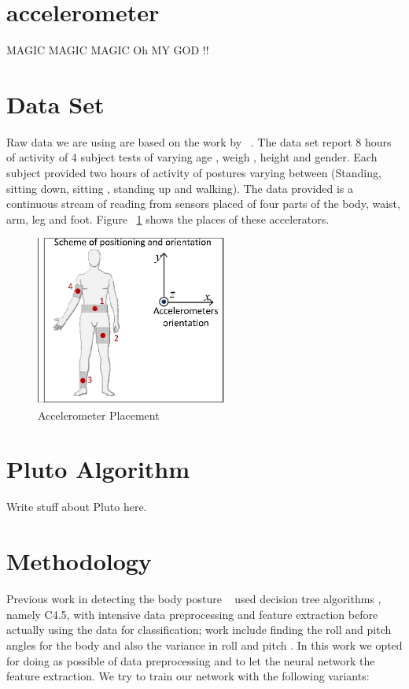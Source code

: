 \documentclass{article}
\begin{document}
\section{accelerometer}
\label{accelerometer} 
MAGIC MAGIC MAGIC Oh MY GOD !!

\section{Data Set}
\label{DataSet}

Raw data we are using are based on the work by ~\cite{ugulino2012wearable}. The data set report 8 hours of activity of 4 subject tests 
of varying age , weigh , height and gender. Each subject provided two hours of activity of postures varying between (Standing,
sitting down, sitting , standing up and walking). The data provided is a continuous stream of reading from sensors placed of four 
parts of the body, waist, arm, leg and foot. Figure ~\ref{acc_placement} shows the places of these accelerators.   


\begin{figure}[h]
\centering
\includegraphics[width=2.5in]{acc_placement}
\caption{Accelerometer Placement}
\label{acc_placement}
\end{figure} 
 

\section{Pluto Algorithm}
\label{Pluto}
Write stuff about Pluto here.

\section{Methodology}
\label{meth}

Previous work in detecting the body posture ~\cite{ugulino2012wearable} used decision tree algorithms , namely C4.5,  with intensive 
data preprocessing and feature extraction before actually using the data for classification; work include finding the roll and 
pitch angles for the body and also the variance in roll and pitch . In this work we opted for doing as possible of data preprocessing
and to let the neural network the feature extraction. We try to train our network with the following variants:
\end{document}

